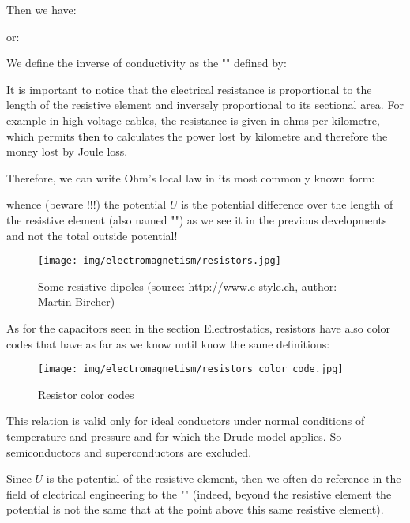 	Then we have:
	
	or:
	
	We define the inverse of conductivity as the "" defined by:
	
	\begin{tcolorbox}[title=Remark,colframe=black,arc=10pt]
	It is important to notice that the electrical resistance is proportional to the length of the resistive element and inversely proportional to its sectional area. For example in high voltage cables, the resistance is given in ohms per kilometre, which permits then to calculates the power lost by kilometre and therefore the money lost by Joule loss.
	\end{tcolorbox}	
	Therefore, we can write Ohm's local law in its most commonly known form:
	
	whence (beware !!!) the potential $U$ is the potential difference over the length of the resistive element (also named "") as we see it in the previous developments and not the total outside potential!
	\begin{figure}[H]
		\centering
		\texttt{[image: img/electromagnetism/resistors.jpg]}
		\caption[Some resistive dipoles]{Some resistive dipoles (source: \url{http://www.e-style.ch}, author: Martin Bircher)}
	\end{figure}
	As for the capacitors seen in the section Electrostatics, resistors have also color codes that have as far as we know until know the same definitions:
	\begin{figure}[H]
		\centering
		\texttt{[image: img/electromagnetism/resistors\_color\_code.jpg]}
		\caption{Resistor color codes}
	\end{figure}
	\begin{tcolorbox}[title=Remark,colframe=black,arc=10pt]
	This relation is valid only for ideal conductors under normal conditions of temperature and pressure and for which the Drude model applies. So semiconductors and superconductors are excluded.
	\end{tcolorbox}
	Since $U$ is the potential of the resistive element, then we often do reference in the field of electrical engineering to the "" (indeed, beyond the resistive element the potential is not the same that at the point above this same resistive element).
	
